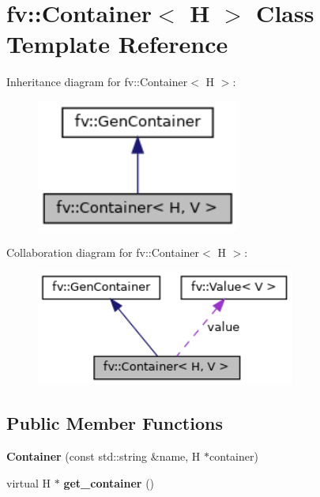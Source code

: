 \hypertarget{classfv_1_1Container}{}\section{fv\+:\+:Container$<$ H $>$ Class Template Reference}
\label{classfv_1_1Container}


Inheritance diagram for fv\+:\+:Container$<$ H $>$\+:
\nopagebreak
\begin{figure}[H]
\begin{center}
\leavevmode
\includegraphics[width=189pt]{classfv_1_1Container__inherit__graph}
\end{center}
\end{figure}


Collaboration diagram for fv\+:\+:Container$<$ H $>$\+:
\nopagebreak
\begin{figure}[H]
\begin{center}
\leavevmode
\includegraphics[width=241pt]{classfv_1_1Container__coll__graph}
\end{center}
\end{figure}
\subsection*{Public Member Functions}
\begin{DoxyCompactItemize}
\item 
\hypertarget{classfv_1_1Container_af182df68521c2b1f61f5b6c330508255}{}\label{classfv_1_1Container_af182df68521c2b1f61f5b6c330508255} 
{\bfseries Container} (const std\+::string \&name, H $\ast$container)
\item 
\hypertarget{classfv_1_1Container_af3caa2b464b5984690392f8b0e9f9c78}{}\label{classfv_1_1Container_af3caa2b464b5984690392f8b0e9f9c78} 
virtual H $\ast$ {\bfseries get\+\_\+container} ()
\end{DoxyCompactItemize}

